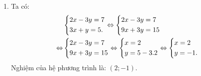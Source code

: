 \begin{ex}
{\begin{enumerate}[1.]
\begin{enumerate}
\begin{enumerate}
        				\item[$\bullet$]Đặt $t=x^2$ $ (t\geq 0)$.
        				\item[$\bullet$] Phương trình đã cho trở thành: $9t^2-16t-25=0$.\\
        				Do $a-b+c=9+16-25=0$ nên $\hoac{&t=-1 \text{ (loại) }\\&t=\dfrac{25}{9}\text{ (nhận). }}$
        				\item[$\bullet$] Với $t=\dfrac{25}{9} \Leftrightarrow x^2=\dfrac{25}{9} \Leftrightarrow x=-\dfrac{5}{3}$ hoặc $x=\dfrac{5}{3}.$
        			\end{enumerate}	
        		Vậy phương trình có hai nghiệm: $x=-\dfrac{5}{3}, x=\dfrac{5}{3}.$
        		\item Ta có:
        		{\allowdisplaybreaks
        		\begin{align*}
        		&\left\{\begin{aligned}&2x-3y=7\\&3x+y=5.\end{aligned}\right. \Leftrightarrow \left\{\begin{aligned}&2x-3y=7\\&9x+3y=15\end{aligned}\right. \\
        		\Leftrightarrow& \left\{\begin{aligned}&2x-3y=7\\&9x+3y=15\end{aligned}\right. \Leftrightarrow \left\{\begin{aligned}&x=2\\&y=5-3.2\end{aligned}\right.
        		\Leftrightarrow \left\{\begin{aligned}&x=2\\&y=-1.\end{aligned}\right.
        		\end{align*}}Nghiệm của  hệ phương trình là: $(2;-1).$
        	\end{enumerate}
    \end{enumerate}
    }
\end{ex}

